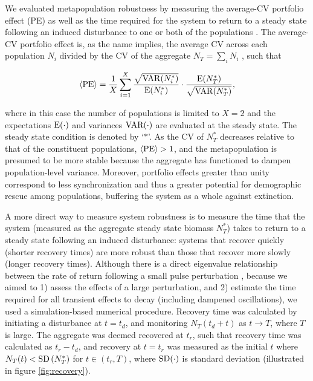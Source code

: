 \documentclass{revtex4}
\begin{document}
\noindent We evaluated metapopulation robustness by measuring the average-CV portfolio effect (PE) \citep{Anderson:2014cx,Schindler:2015gf} as well as the time required for the system to return to a steady state following an induced disturbance to one or both of the populations \citep{Ovaskainen:2002il}.
The average-CV portfolio effect is, as the name implies, the average CV across each population $N_i$ divided by the CV of the aggregate $N_T=\sum_i N_i$ \citep{Anderson:2013gb}, such that


\begin{equation}
\langle{\rm PE}\rangle =\frac{1}{X}\sum_{i=1}^{X} \frac{\sqrt{{\rm VAR}(N_i^*)}}{{\rm E}(N_i^*)}\cdot \frac{{\rm E}(N_T^*)}{\sqrt{{\rm VAR}(N_T^*)}},
\label{eq:pe}
\end{equation}

\noindent where in this case the number of populations is limited to $X=2$ and the expectations $\rm E(\cdot)$ and variances $\rm VAR(\cdot)$ are evaluated at the steady state.
The steady state condition is denoted by `$*$'.
As the CV of $N_T^*$ decreases relative to that of the constituent populations, $\langle{\rm PE}\rangle > 1$, and the metapopulation is presumed to be more stable because the aggregate has functioned to dampen population-level variance.
Moreover, portfolio effects greater than unity correspond to less synchronization  \citep{Loreau:2008ju,Anderson:2014cx,Yeakel:2013vz} and thus a greater potential for demographic rescue among populations, buffering the system as a whole against extinction. 

A more direct way to measure system robustness is to measure the time that the system (measured as the aggregate steady state biomass $N_T^*$) takes to return to a steady state following an induced disturbance: systems that recover quickly (shorter recovery times) are more robust than those that recover more slowly (longer recovery times).
Although there is a direct eigenvalue relationship between the rate of return following a small pulse perturbation \citep{GuckHolmes}, because we aimed to 1) assess the effects of a large perturbation, and 2) estimate the time required for all transient effects to decay (including dampened oscillations), we used a simulation-based numerical procedure.
Recovery time was calculated by initiating a disturbance at $t=t_d$, and monitoring $N_T(t_d+t)$ as $t\rightarrow T$, where $T$ is large. 
The aggregate was deemed recovered at $t_r$, such that recovery time was calculated as $t_r-t_d$, and recovery at $t=t_r$ was measured as the initial $t$ where $N_T(t) < {\rm SD}\left( N_T^* \right)$ for $t\in(t_r,T)$, where $\rm{SD}(\cdot)$ is standard deviation (illustrated in figure \ref{fig:recovery}).
\end{document}

